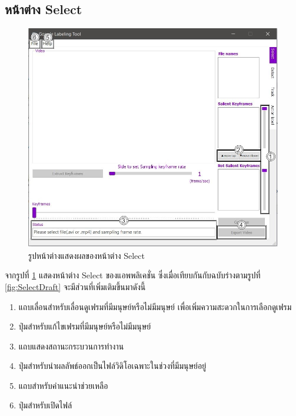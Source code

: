 \subsection*{หน้าต่าง Select}
\begin{figure}[!ht]
  \centering
    \includegraphics[scale=0.4]{chapter4/images/Final_ui/Select.jpg}
    \caption{รูปหน้าต่างแสดงผลของหน้าต่าง Select}
    \label{fig:final_select}
\end{figure}
จากรูปที่ \ref{fig:final_select} แสดงหน้าต่าง Select ของแอพพลิเคชั่น ซึ่งเมื่อเทียบกันกับฉบับร่างตามรูปที่ \ref{fig:SelectDraft} จะมีส่วนที่เพิ่มเติมขึ้นมาดังนี้
\begin{enumerate}
	\item แถบเลื่อนสำหรับเลื่อนดูเฟรมที่มีมนุษย์หรือไม่มีมนุษย์ เพื่อเพิ่มความสะดวกในการเลือกดูเฟรม
	\item ปุ่มสำหรับแก้ไขเฟรมที่มีมนุษย์หรือไม่มีมนุษย์
	\item แถบแสดงสถานะกระบวนการทำงาน
	\item ปุ่มสำหรับนำผลลัพธ์ออกเป็นไฟล์วิดิโอเฉพาะในช่วงที่มีมนุษย์อยู่
	\item แถบสำหรับคำแนะนำช่วยเหลือ
	\item ปุ่มสำหรับเปิดไฟล์
\end{enumerate}		

\clearpage
